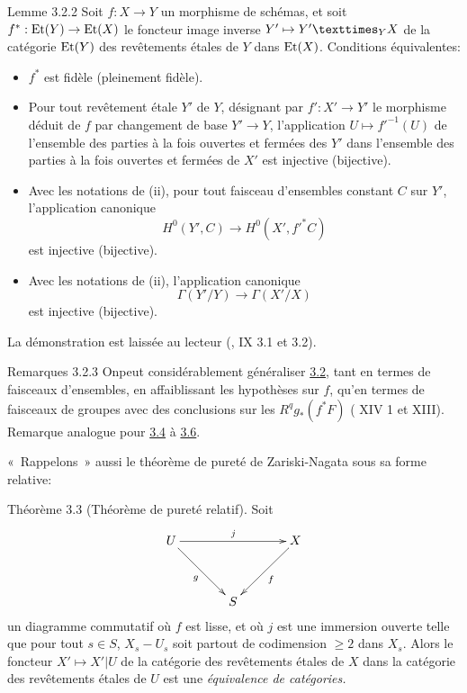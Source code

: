 \documentclass[10pt]{../fichiers-configuration-latex/smfart}
\begin{document}
\begin{enonce*}{Lemme 3.2.2}
Soit $f:X\rightarrow Y$ un morphisme de schémas, et soit
$f^{\ast}:\operatorname{Et}(Y)\rightarrow \operatorname{Et}(X)$ le foncteur image inverse
$Y'\mapsto \fprod{Y'}{X}{Y}$ de la catégorie $\operatorname{Et}(Y)$ des revêtements
étales de $Y$ dans $\operatorname{Et}(X)$. Conditions équivalentes:
\begin{itemize}
\item[(i)] $f^{\ast}$ est fidèle (\resp pleinement fidèle).

\item[(ii)] Pour tout revêtement étale $Y'$ de $Y$, désignant par
  $f':X'\rightarrow Y'$ le morphisme déduit de $f$ par changement de
  base $Y'\rightarrow Y$, l'application $U\mapsto {f'}^{-1}(U)$ de
  l'ensemble des parties à la fois ouvertes et fermées des $Y'$ dans
  l'ensemble des parties à la fois ouvertes et fermées de $X'$ est
  injective (\resp bijective).

\item[(ii bis)] Avec les notations de {\rm(ii)}, pour tout faisceau
  d'ensembles constant $C$ sur $Y'$, l'application canonique
$$
H^{0}(Y',C)\longrightarrow H^{0}(X',{f'}^{\ast}C)
$$
est injective (\resp bijective).

\item[(iii)] Avec les notations de {\rm(ii)}, l'application canonique
$$
\Gamma(Y'/Y)\longrightarrow \Gamma(X'/X)
$$
est injective (\resp bijective).
\end{itemize}
\end{enonce*}

La démonstration est laissée au lecteur (\cf {}, IX 3.1 et 3.2).

\begin{enonce*}[remark]{Remarques 3.2.3}
On\pageoriginale peut considérablement généraliser \hyperref[XVI.prop3.2]{3.2}, tant en termes
de faisceaux d'ensembles, en affaiblissant les hypothèses sur $f$,
qu'en termes de faisceaux de groupes avec des conclusions sur les
$R^{q}g_{\ast}(f^{\ast}F)$ (\cf {} XIV 1 et  XIII). Remarque
analogue pour \hyperref[XVI.cor3.4]{3.4} à \hyperref[XVI.cor3.6]{3.6}.
\end{enonce*}

« Rappelons »  aussi le théorème de pureté de Zariski-Nagata
sous sa forme relative:

\begin{enonce*}{Théorème 3.3}
(Théorème de pureté relatif). Soit
$$
\xymatrix@=1.25cm{
U \ar[rr]^{j} \ar[rd]_{g}&     &X\ar[ld]^{f}\\
  & S   &
}
$$
un diagramme commutatif où $f$ est lisse, et où $j$ est une immersion
ouverte telle que pour tout $s\in S$, $X_s-U_s$ soit partout de
codimension $\geq 2$ dans $X_s$. Alors le foncteur $X'\mapsto X'|U$ de
la catégorie des revêtements étales de $X$ dans la catégorie des
revêtements étales de $U$ est une \emph{équivalence de catégories.}
\end{enonce*}
\end{document}
